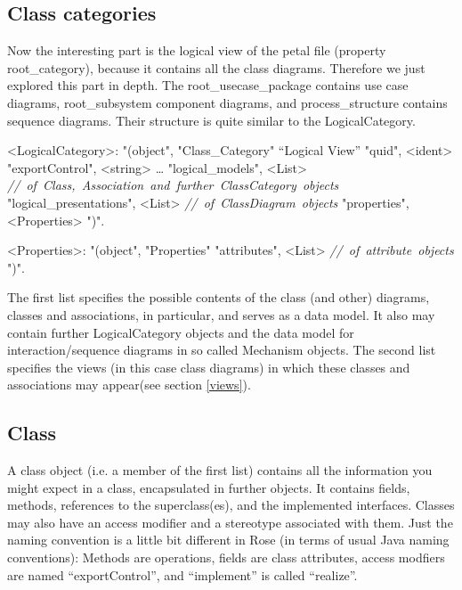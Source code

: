 \documentclass{article}
\newcommand\comment[1]{\emph{\mbox{// #1}}\newline}
\newenvironment{mygrammar}{\begin{grammar}%
      [(colon){ $\rightarrow$}]%
      [(semicolon)$|$]%
      [(comma){ }]%
      [(period){\\}]%
      [(quote){\begin{bf}}{\end{bf}}]%
      [(nonterminal){$\langle$}{$\rangle$}]}%
      {\end{grammar}}
\begin{document}
\subsection{Class categories}\label{logical}

Now the interesting part is the logical view of the petal file
(property root\_category), because it contains all the class
diagrams. Therefore we just explored this part in depth. The
root\_usecase\_package contains use case diagrams, root\_subsystem
component diagrams, and process\_structure contains sequence
diagrams. Their structure is quite similar to the LogicalCategory.

\begin{mygrammar}
<LogicalCategory>: "(object", "Class\_Category" ``Logical View''\newline
         "quid",               <ident>\newline
         "exportControl",      <string>\newline
         \dots\newline
         "logical\_models",            <List> \comment{of Class,
         Association and further ClassCategory objects}
         "logical\_presentations",     <List> \comment{of ClassDiagram objects}
         "properties",                 <Properties>
")".

<Properties>: "(object",  "Properties"\newline
              "attributes", <List> \comment{of attribute objects}
")".
\end{mygrammar}

The first list specifies the possible contents of the class (and
other) diagrams, classes and associations, in particular, and serves
as a data model. It also may contain further LogicalCategory objects
and the data model for interaction/sequence diagrams in so called
Mechanism objects. The second list specifies the views (in this case
class diagrams) in which these classes and associations may appear(see
section \ref{views}).

\subsection{Class}

A class object (i.e. a member of the first list) contains all the
information you might expect in a class, encapsulated in further
objects. It contains fields, methods, references to the
superclass(es), and the implemented interfaces. Classes may also have
an access modifier and a stereotype associated with them. Just the
naming convention is a little bit different in Rose (in terms of usual
Java naming conventions): Methods are operations, fields are class
attributes, access modfiers are named ``exportControl'', and
``implement'' is called ``realize''.
\end{document}
